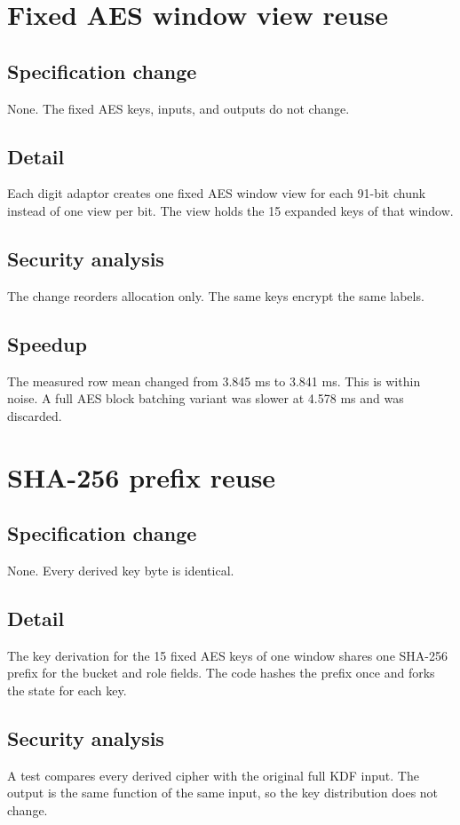 \documentclass[10pt]{article}
\begin{document}
\section{Fixed AES window view reuse}
\label{sec:o5}

\subsection{Specification change}
None.
The fixed AES keys, inputs, and outputs do not change.

\subsection{Detail}
Each digit adaptor creates one fixed AES window view for each 91-bit chunk instead of one view per bit.
The view holds the 15 expanded keys of that window.

\subsection{Security analysis}
The change reorders allocation only.
The same keys encrypt the same labels.

\subsection{Speedup}
The measured row mean changed from 3.845 ms to 3.841 ms.
This is within noise.
A full AES block batching variant was slower at 4.578 ms and was discarded.

\section{SHA-256 prefix reuse}
\label{sec:o6}

\subsection{Specification change}
None.
Every derived key byte is identical.

\subsection{Detail}
The key derivation for the 15 fixed AES keys of one window shares one SHA-256 prefix for the bucket and role fields.
The code hashes the prefix once and forks the state for each key.

\subsection{Security analysis}
A test compares every derived cipher with the original full KDF input.
The output is the same function of the same input, so the key distribution does not change.
\end{document}
